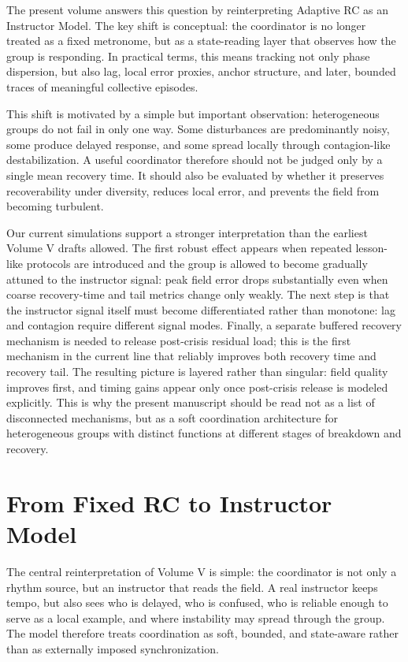 \documentclass[12pt,a4paper]{article}
\begin{document}
The present volume answers this question by reinterpreting Adaptive RC as an Instructor Model. The key shift is conceptual: the coordinator is no longer treated as a fixed metronome, but as a state-reading layer that observes how the group is responding. In practical terms, this means tracking not only phase dispersion, but also lag, local error proxies, anchor structure, and later, bounded traces of meaningful collective episodes.

This shift is motivated by a simple but important observation: heterogeneous groups do not fail in only one way. Some disturbances are predominantly noisy, some produce delayed response, and some spread locally through contagion-like destabilization. A useful coordinator therefore should not be judged only by a single mean recovery time. It should also be evaluated by whether it preserves recoverability under diversity, reduces local error, and prevents the field from becoming turbulent.

Our current simulations support a stronger interpretation than the earliest Volume V drafts allowed. The first robust effect appears when repeated lesson-like protocols are introduced and the group is allowed to become gradually attuned to the instructor signal: peak field error drops substantially even when coarse recovery-time and tail metrics change only weakly. The next step is that the instructor signal itself must become differentiated rather than monotone: lag and contagion require different signal modes. Finally, a separate buffered recovery mechanism is needed to release post-crisis residual load; this is the first mechanism in the current line that reliably improves both recovery time and recovery tail. The resulting picture is layered rather than singular: field quality improves first, and timing gains appear only once post-crisis release is modeled explicitly. This is why the present manuscript should be read not as a list of disconnected mechanisms, but as a soft coordination architecture for heterogeneous groups with distinct functions at different stages of breakdown and recovery.

\section{From Fixed RC to Instructor Model}
The central reinterpretation of Volume V is simple: the coordinator is not only a rhythm source, but an instructor that reads the field. A real instructor keeps tempo, but also sees who is delayed, who is confused, who is reliable enough to serve as a local example, and where instability may spread through the group. The model therefore treats coordination as soft, bounded, and state-aware rather than as externally imposed synchronization.
\end{document}
